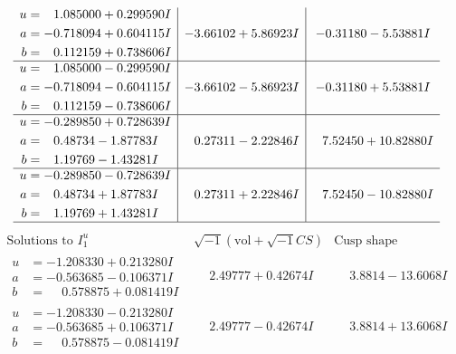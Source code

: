 \documentclass[1p]{elsarticle_modified}
\theoremstyle{definition}
\newcommand{\I}{\sqrt{-1}}
\begin{document}
$$\begin{array}{c|c|c}
\begin{aligned}
u &= \phantom{-}1.085000 + 0.299590 I \\
a &= -0.718094 + 0.604115 I \\
b &= \phantom{-}0.112159 + 0.738606 I\end{aligned}
 & -3.66102 + 5.86923 I & -0.31180 - 5.53881 I \\ \hline\begin{aligned}
u &= \phantom{-}1.085000 - 0.299590 I \\
a &= -0.718094 - 0.604115 I \\
b &= \phantom{-}0.112159 - 0.738606 I\end{aligned}
 & -3.66102 - 5.86923 I & -0.31180 + 5.53881 I \\ \hline\begin{aligned}
u &= -0.289850 + 0.728639 I \\
a &= \phantom{-}0.48734 - 1.87783 I \\
b &= \phantom{-}1.19769 - 1.43281 I\end{aligned}
 & \phantom{-}0.27311 - 2.22846 I & \phantom{-}7.52450 + 10.82880 I \\ \hline\begin{aligned}
u &= -0.289850 - 0.728639 I \\
a &= \phantom{-}0.48734 + 1.87783 I \\
b &= \phantom{-}1.19769 + 1.43281 I\end{aligned}
 & \phantom{-}0.27311 + 2.22846 I & \phantom{-}7.52450 - 10.82880 I\\
 \hline 
 \end{array}$$\newpage$$\begin{array}{c|c|c}  
\text{Solutions to }I^u_{1}& \I (\text{vol} + \sqrt{-1}CS) & \text{Cusp shape}\\
 \hline 
\begin{aligned}
u &= -1.208330 + 0.213280 I \\
a &= -0.563685 - 0.106371 I \\
b &= \phantom{-}0.578875 + 0.081419 I\end{aligned}
 & \phantom{-}2.49777 + 0.42674 I & \phantom{-}3.8814 - 13.6068 I \\ \hline\begin{aligned}
u &= -1.208330 - 0.213280 I \\
a &= -0.563685 + 0.106371 I \\
b &= \phantom{-}0.578875 - 0.081419 I\end{aligned}
 & \phantom{-}2.49777 - 0.42674 I & \phantom{-}3.8814 + 13.6068 I \\ \hline\begin{aligned}

\end{aligned}
\end{array}$$
\end{document}
